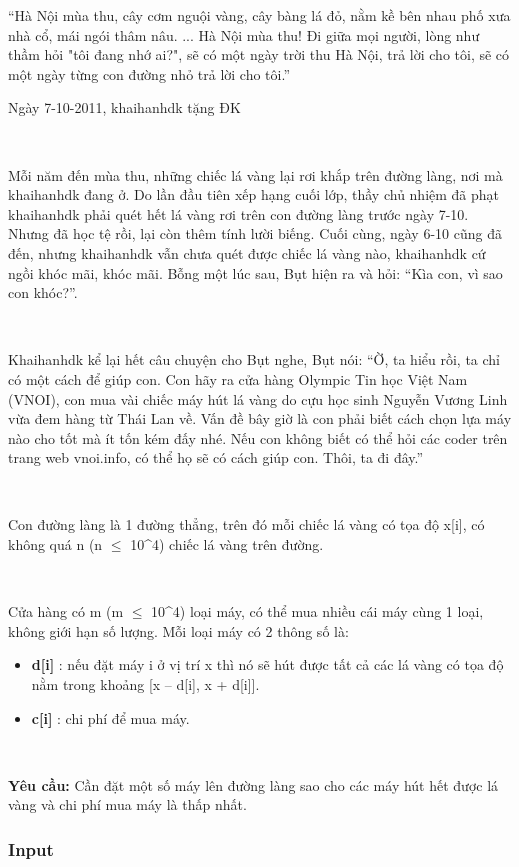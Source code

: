 

“Hà Nội mùa thu, cây cơm nguội vàng, cây bàng lá đỏ, nằm kề bên nhau phố xưa nhà cổ, mái ngói thâm nâu. ... Hà Nội mùa thu! Đi giữa mọi người, lòng như thầm hỏi "tôi đang nhớ ai?", sẽ có một ngày trời thu Hà Nội, trả lời cho tôi, sẽ có một ngày từng con đường nhỏ trả lời cho tôi.”

Ngày 7-10-2011, khaihanhdk tặng ĐK

 

Mỗi năm đến mùa thu, những chiếc lá vàng lại rơi khắp trên đường làng, nơi mà khaihanhdk đang ở. Do lần đầu tiên xếp hạng cuối lớp, thầy chủ nhiệm đã phạt khaihanhdk phải quét hết lá vàng rơi trên con đường làng trước ngày 7-10. Nhưng đã học tệ rồi, lại còn thêm tính lười biếng. Cuối cùng, ngày 6-10 cũng đã đến, nhưng khaihanhdk vẫn chưa quét được chiếc lá vàng nào, khaihanhdk cứ ngồi khóc mãi, khóc mãi. Bỗng một lúc sau, Bụt hiện ra và hỏi: “Kìa con, vì sao con khóc?”.

 

Khaihanhdk kể lại hết câu chuyện cho Bụt nghe, Bụt nói: “Ờ, ta hiểu rồi, ta chỉ có một cách để giúp con. Con hãy ra cửa hàng Olympic Tin học Việt Nam (VNOI), con mua vài chiếc máy hút lá vàng do cựu học sinh Nguyễn Vương Linh vừa đem hàng từ Thái Lan về. Vấn đề bây giờ là con phải biết cách chọn lựa máy nào cho tốt mà ít tốn kém đấy nhé. Nếu con không biết có thể hỏi các coder trên trang web vnoi.info, có thể họ sẽ có cách giúp con. Thôi, ta đi đây.”

 

Con đường làng là 1 đường thẳng, trên đó mỗi chiếc lá vàng có tọa độ x[i], có không quá n (n  $\le$  10^4) chiếc lá vàng trên đường.

 

Cửa hàng có m (m  $\le$  10^4) loại máy, có thể mua nhiều cái máy cùng 1 loại, không giới hạn số lượng. Mỗi loại máy có 2 thông số là:
\begin{itemize}
	\item \textbf{d[i] } : nếu đặt máy i ở vị trí x thì nó sẽ hút được tất cả các lá vàng có tọa độ nằm trong khoảng [x – d[i], x + d[i]].
	\item \textbf{c[i] } : chi phí để mua máy.
\end{itemize}

 

\textbf{Yêu cầu: } Cần đặt một số máy lên đường làng sao cho các máy hút hết được lá vàng và chi phí mua máy là thấp nhất.

\subsubsection{Input}

